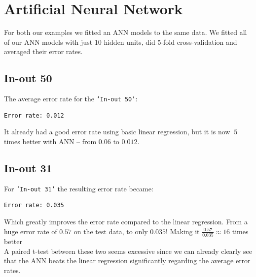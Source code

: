 \section{Artificial Neural Network}
For both our examples we fitted an ANN models to the same data. We fitted all of our ANN models with just 10 hidden units, did 5-fold cross-validation and averaged their error rates. 

\subsection*{In-out 50}
The average error rate for the \texttt{'In-out 50'}:

\begin{verbatim}
Error rate: 0.012
\end{verbatim}

It already had a good error rate using basic linear regression, but it is now $~5$ times better with ANN -- from $0.06$ to $0.012$.

\subsection*{In-out 31}
For \texttt{'In-out 31'} the resulting error rate became:

\begin{verbatim}
Error rate: 0.035
\end{verbatim}

Which greatly improves the error rate compared to the linear regression. From a huge error rate of $0.57$ on the test data, to only $0.035$! Making it $\frac{0.57}{0.035} \approx 16$ times better \\

A paired t-test between these two seems excessive since we can already clearly see that the ANN beats the linear regression significantly regarding the average error rates.

